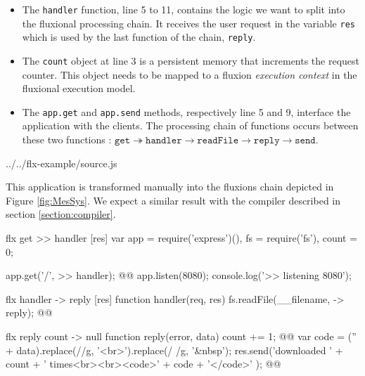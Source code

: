 \begin{itemize}
  \item The \texttt{handler} function, line 5 to 11, contains the logic we want to split into the fluxional processing chain.
  It receives the user request in the variable \texttt{res} which is used by the last function of the chain, \texttt{reply}.
  \item The \texttt{count} object at line 3 is a persistent memory that increments the request counter.
  This object needs to be mapped to a fluxion \textit{execution context} in the fluxional execution model.
  \item The \texttt{app.get} and \texttt{app.send} methods, respectively line 5 and 9, interface the application with the clients.
  The processing chain of functions occurs between these two functions : $\texttt{get} \twoheadrightarrow \texttt{handler} \to \texttt{readFile} \to \texttt{reply} \to \texttt{send}$.
\end{itemize}

{../../flx-example/source.js}

This application is transformed manually into the fluxions chain depicted in Figure \ref{fig:MesSys}.
We expect a similar result with the compiler described in section \ref{section:compiler}.


\begin{code}[flx, caption={Manual transformation of the example application in our high-level fluxional language},label={lst:fluxional}]
flx get
>> handler [res]
  var app = require('express')(),
      fs = require('fs'),
      count = 0;

  app.get('/', >> handler); @\label{lst:fluxional-streamtohandler}@
  app.listen(8080);
  console.log('>> listening 8080');

flx handler
-> reply [res]
  function handler(req, res) {
    fs.readFile(__filename, -> reply); @\label{lst:fluxional-readfile}@
  }

flx reply {count}
-> null
  function reply(error, data) {
    count += 1; @\label{lst:fluxional-counter}@
    var code = ('' + data).replace(/\n/g, '<br>').replace(/ /g, '&nbsp');
    res.send('downloaded ' + count + ' times<br><br><code>' + code + '</code>' ); @\label{lst:fluxional-ressend}@
  }
\end{code}

